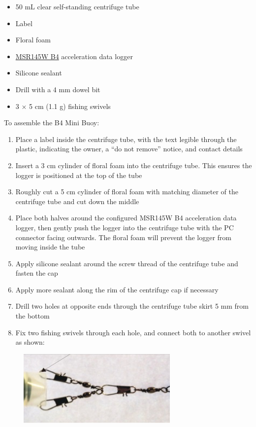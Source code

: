 \documentclass[
  letterpaper,
  DIV=11,
  numbers=noendperiod]{scrreprt}
\providecommand{\tightlist}{%
  \setlength{\itemsep}{0pt}\setlength{\parskip}{0pt}}\usepackage{longtable,booktabs,array}
\begin{document}
\begin{itemize}
\tightlist
\item
  50 mL clear self-standing centrifuge tube
\item
  Label
\item
  Floral foam
\item
  \href{https://www.msr.ch/en/product/msr145/}{MSR145W B4} acceleration
  data logger
\item
  Silicone sealant
\item
  Drill with a 4 mm dowel bit
\item
  3 × 5 cm (1.1 g) fishing swivels
\end{itemize}

To assemble the B4 Mini Buoy:

\begin{enumerate}
\def\labelenumi{\arabic{enumi}.}
\tightlist
\item
  Place a label inside the centrifuge tube, with the text legible
  through the plastic, indicating the owner, a ``do not remove'' notice,
  and contact details
\item
  Insert a 3 cm cylinder of floral foam into the centrifuge tube. This
  ensures the logger is positioned at the top of the tube
\item
  Roughly cut a 5 cm cylinder of floral foam with matching diameter of
  the centrifuge tube and cut down the middle
\item
  Place both halves around the configured MSR145W B4 acceleration data
  logger, then gently push the logger into the centrifuge tube with the
  PC connector facing outwards. The floral foam will prevent the logger
  from moving inside the tube
\item
  Apply silicone sealant around the screw thread of the centrifuge tube
  and fasten the cap
\item
  Apply more sealant along the rim of the centrifuge cap if necessary
\item
  Drill two holes at opposite ends through the centrifuge tube skirt 5
  mm from the bottom
\item
  Fix two fishing swivels through each hole, and connect both to another
  swivel as shown:
\end{enumerate}

\begin{figure}

{\centering \includegraphics[width=0.7\textwidth,height=\textheight]{chapters/figs/B4FishingSwivel.png}

}

\end{figure}
\end{document}

